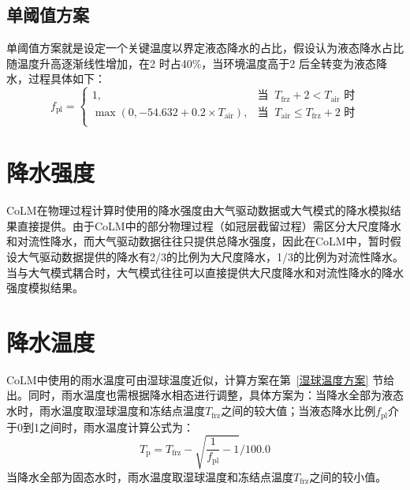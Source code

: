 \subsection{单阈值方案}
单阈值方案就是设定一个关键温度以界定液态降水的占比，假设认为液态降水占比随温度升高逐渐线性增加，在2 \textcelsius 时占40\%，当环境温度高于2 \textcelsius 后全转变为液态降水，过程具体如下：
\begin{equation}
  f_{\mathrm{pl}}= \begin{cases}
    1, & \text{当 }\ T_{\mathrm{frz}}+2 < T_{\mathrm {air}} \text{ 时}\\
    \max(0,-54.632 + 0.2\times T_{\mathrm {air}}), & \text{当 }\ T_{\mathrm {air}} \leqslant T_{\mathrm{frz}} + 2 \text{ 时} \\
  \end{cases}
\end{equation}


\section{降水强度}
CoLM在物理过程计算时使用的降水强度由大气驱动数据或大气模式的降水模拟结果直接提供。由于CoLM中的部分物理过程（如冠层截留过程）需区分大尺度降水和对流性降水，而大气驱动数据往往只提供总降水强度，因此在CoLM中，暂时假设大气驱动数据提供的降水有2/3的比例为大尺度降水，1/3的比例为对流性降水。当与大气模式耦合时，大气模式往往可以直接提供大尺度降水和对流性降水的降水强度模拟结果。


\section{降水温度}
CoLM中使用的雨水温度可由湿球温度近似，计算方案在第~\ref{湿球温度方案} 节给出。同时，雨水温度也需根据降水相态进行调整，具体方案为：当降水全部为液态水时，雨水温度取湿球温度和冻结点温度$T_{\mathrm{frz}}$之间的较大值；当液态降水比例$f_{\mathrm{pl}}$介于0到1之间时，雨水温度计算公式为：$$T_{\mathrm {p}}=T_{\mathrm{frz}}-\sqrt{\frac{1}{f_{\mathrm{pl}}}-1}/100.0$$
当降水全部为固态水时，雨水温度取湿球温度和冻结点温度$T_{\mathrm{frz}}$之间的较小值。



